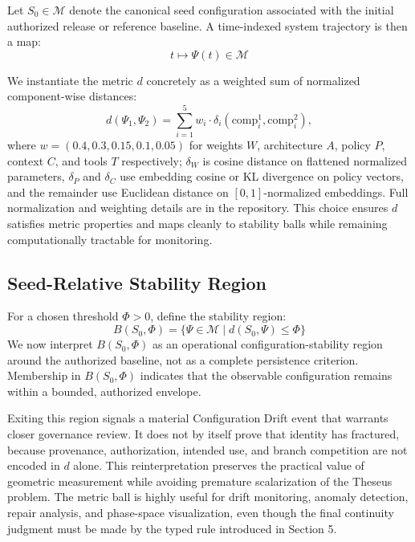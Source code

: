 \documentclass[11pt,a4paper]{article}
\begin{document}
Let \(S_{0} \in \mathcal{M}\) denote the canonical seed configuration associated with the initial authorized release or reference baseline. A time-indexed system trajectory is then a map:
\begin{equation}
t \mapsto \Psi(t) \in \mathcal{M}
\end{equation}

We instantiate the metric \(d\) concretely as a weighted sum of normalized component-wise distances:
\[
d(\Psi_1, \Psi_2) = \sum_{i=1}^{5} w_i \cdot \delta_i(\text{comp}_i^1, \text{comp}_i^2),
\]
where \(w = (0.4, 0.3, 0.15, 0.1, 0.05)\) for weights \(W\), architecture \(A\), policy \(P\), context \(C\), and tools \(T\) respectively; \(\delta_W\) is cosine distance on flattened normalized parameters, \(\delta_P\) and \(\delta_C\) use embedding cosine or KL divergence on policy vectors, and the remainder use Euclidean distance on \([0,1]\)-normalized embeddings. Full normalization and weighting details are in the repository. This choice ensures \(d\) satisfies metric properties and maps cleanly to stability balls while remaining computationally tractable for monitoring.

\subsection{Seed-Relative Stability Region}
For a chosen threshold \(\Phi > 0\), define the stability region:
\begin{equation}
B(S_{0}, \Phi) = \{ \Psi \in \mathcal{M} \mid d(S_{0}, \Psi) \le \Phi \}
\end{equation}
We now interpret \(B(S_{0}, \Phi)\) as an operational configuration-stability region around the authorized baseline, not as a complete persistence criterion. Membership in \(B(S_{0}, \Phi)\) indicates that the observable configuration remains within a bounded, authorized envelope. 

Exiting this region signals a material Configuration Drift event that warrants closer governance review. It does not by itself prove that identity has fractured, because provenance, authorization, intended use, and branch competition are not encoded in \(d\) alone. This reinterpretation preserves the practical value of geometric measurement while avoiding premature scalarization of the Theseus problem. The metric ball is highly useful for drift monitoring, anomaly detection, repair analysis, and phase-space visualization, even though the final continuity judgment must be made by the typed rule introduced in Section 5.
\end{document}
